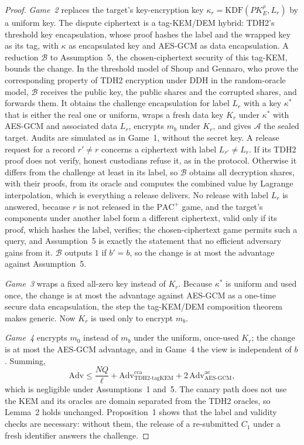 \documentclass[11pt]{article}
\newcommand{\PAC}{\mathrm{PAC}}
\begin{document}
\begin{proof}
\emph{Game~2} replaces the target's key-encryption key $\kappa_r=\mathrm{KDF}(PK_E^{\rho},L_r)$ by a uniform key. The dispute ciphertext is a tag-KEM/DEM hybrid\cite{abe2008tagkem}: TDH2's threshold key encapsulation, whose proof hashes the label and the wrapped key as its tag, with $\kappa$ as encapsulated key and AES-GCM as data encapsulation. A reduction $\mathcal{B}$ to Assumption~5, the chosen-ciphertext security of this tag-KEM, bounds the change. In the threshold model of Shoup and Gennaro\cite{shoup2002securing}, who prove the corresponding property of TDH2 encryption under DDH in the random-oracle model, $\mathcal{B}$ receives the public key, the public shares and the corrupted shares, and forwards them. It obtains the challenge encapsulation for label $L_r$ with a key $\kappa^{*}$ that is either the real one or uniform, wraps a fresh data key $K_r$ under $\kappa^{*}$ with AES-GCM and associated data $L_r$, encrypts $m_b$ under $K_r$, and gives $\mathcal{A}$ the sealed target. Audits are simulated as in Game~1, without the secret key. A release request for a record $r'\neq r$ concerns a ciphertext with label $L_{r'}\neq L_r$. If its TDH2 proof does not verify, honest custodians refuse it, as in the protocol. Otherwise it differs from the challenge at least in its label, so $\mathcal{B}$ obtains all decryption shares, with their proofs, from its oracle and computes the combined value by Lagrange interpolation, which is everything a release delivers. No release with label $L_r$ is answered, because $r$ is not released in the $\PAC^{+}$ game, and the target's components under another label form a different ciphertext, valid only if its proof, which hashes the label, verifies; the chosen-ciphertext game permits such a query, and Assumption~5 is exactly the statement that no efficient adversary gains from it. $\mathcal{B}$ outputs $1$ if $b'=b$, so the change is at most the advantage against Assumption~5.

\emph{Game~3} wraps a fixed all-zero key instead of $K_r$. Because $\kappa^{*}$ is uniform and used once, the change is at most the advantage against AES-GCM as a one-time secure data encapsulation, the step the tag-KEM/DEM composition theorem\cite{abe2008tagkem} makes generic. Now $K_r$ is used only to encrypt $m_b$.

\emph{Game~4} encrypts $m_0$ instead of $m_b$ under the uniform, once-used $K_r$; the change is at most the AES-GCM advantage, and in Game~4 the view is independent of $b$. Summing,
\[
\mathrm{Adv}\le \frac{NQ}{\ell}+\mathrm{Adv}^{\mathrm{cca}}_{\mathrm{TDH2\text{-}tagKEM}}+2\,\mathrm{Adv}^{\mathrm{ae}}_{\mathrm{AES\text{-}GCM}},
\]
which is negligible under Assumptions~1 and~5. The canary path does not use the KEM and its oracles are domain separated from the TDH2 oracles, so Lemma~2 holds unchanged. Proposition~1 shows that the label and validity checks are necessary: without them, the release of a re-submitted $C_1$ under a fresh identifier answers the challenge.
\end{proof}
\end{document}
